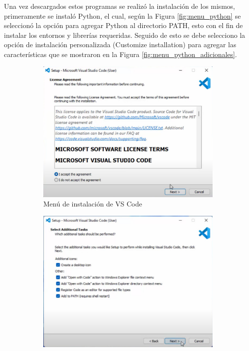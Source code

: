 Una vez descargados estos programas se realizó la instalación de los mismos, primeramente se instaló Python, el cual, según la Figura \ref{fig:menu_python} se seleccionó la opción para agregar Python al directorio PATH, esto con el fin de instalar los entornos y librerías requeridas. Seguido de esto se debe selecciono la opción de instalación personalizada (Customize installation) para  agregar las características que se mostraron en la Figura \ref{fig:menu_python_adicionales}. 
\newpage

\begin{figure}[htbp]
    \centering
    \begin{subfigure}[b]{0.45\textwidth}
        \centering
        \includegraphics[width=\textwidth]{fig/especifico_2/Ambiente_matlab/instalacion_vs_code.pdf}
        \caption{Menú de instalación de VS Code}
        \label{fig:menu_vscode}
    \end{subfigure}
    \hfill
    \begin{subfigure}[b]{0.45\textwidth}
        \centering
        \includegraphics[width=\textwidth]{fig/especifico_2/Ambiente_matlab/opciones_adicionales_vs_code.pdf}

\end{subfigure}
\end{figure}
